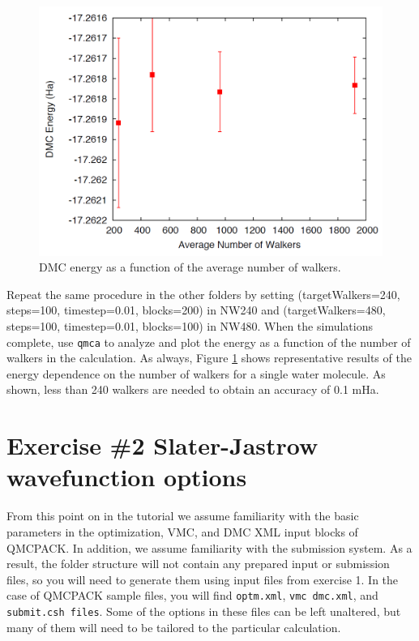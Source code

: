 \begin{figure}
\begin{center}
\includegraphics[trim = 0mm 0mm 0mm 0mm, clip,width=0.75\columnwidth]{./figures/lab_advanced_molecules_dmc_popcont.png}
\end{center}
\caption{DMC energy as a function of the average number of walkers.}
\label{fig:lam_dmc_popcont}
\end{figure}

Repeat the same procedure in the other folders by setting (targetWalkers=240,
steps=100, timestep=0.01, blocks=200) in NW240 and (targetWalkers=480, 
steps=100, timestep=0.01, blocks=100) in NW480. When
the simulations complete, use \texttt{qmca} to analyze and plot the energy as a function of the
number of walkers in the calculation. As always, Figure \ref{fig:lam_dmc_popcont} 
shows representative results of the
energy dependence on the number of walkers for a single water molecule. As shown,
less than 240 walkers are needed to obtain an accuracy of 0.1 mHa.


\section{Exercise \#2 Slater-Jastrow wavefunction options}
From this point on in the tutorial we assume familiarity with the basic parameters in the
optimization, VMC, and DMC XML input blocks of QMCPACK. In addition, we assume
familiarity with the submission system. As a result, the folder structure will not contain
any prepared input or submission files, so you will need to generate them using 
input files from exercise 1. In the case of QMCPACK sample 
files, you will find \texttt{optm.xml}, \texttt{vmc dmc.xml}, and \texttt{submit.csh files}. Some of
the options in these files can be left unaltered, but many of them will need to be tailored to
the particular calculation.

